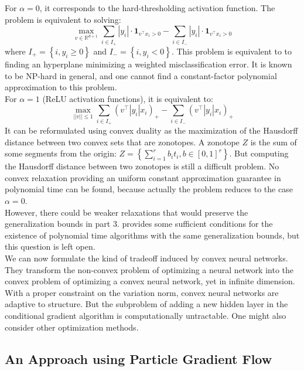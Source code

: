 \documentclass[a4paper, 11pt]{scrartcl}
\begin{document}
For $\alpha = 0$, it corresponds to the hard-thresholding activation function. The problem is equivalent to solving:
\begin{equation}
\max_{v \in \mathbb{R}^{d+1}} \sum_{i\in I_+} |y_i| \cdot \mathbf{1}_{v^\top x_i> 0}  - \sum_{i\in I_-} |y_i| \cdot \mathbf{1}_{v^\top x_i> 0}
\end{equation}
where $I_+ = \left\{i, y_i \geq 0 \right\}$ and $I_- = \left\{i, y_i < 0 \right\}$. This problem is equivalent to to finding an hyperplane minimizing a weighted misclassification error. It is known to be NP-hard in general, and one cannot find a constant-factor polynomial approximation to this problem.\\

For $\alpha = 1$ (ReLU activation functions), it is equivalent to:
\begin{equation}
\max_{||v|| \leq 1} \sum_{i\in I_+} (v^\top |y_i| x_i )_+  - \sum_{i\in I_-} (v^\top |y_i| x_i )_+
\end{equation}
It can be reformulated using convex duality as the maximization of the Hausdorff distance between two convex sets that are zonotopes. A zonotope $Z$ is the sum of some segments from the origin: $Z = \left\{ \sum_{i=1}^r b_i t_i, b \in [0, 1]^r \right\}$. But computing the Hausdorff distance between two zonotopes is still a difficult problem. No convex relaxation providing an uniform constant approximation guarantee in polynomial time can be found, because actually the problem reduces to the case $\alpha = 0$.\\

However, there could be weaker relaxations that would preserve the generalization bounds in part 3. \cite{bach2017breaking} provides some sufficient conditions for the existence of polynomial time algorithms with the same generalization bounds, but this question is left open.\\

We can now formulate the kind of tradeoff induced by convex neural networks. They transform the non-convex problem of optimizing a neural network into the convex problem of optimizing a convex neural network, yet in infinite dimension. With a proper constraint on the variation norm, convex neural networks are adaptive to structure. But the subproblem of adding a new hidden layer in the conditional gradient algorithm is computationally untractable. One might also consider other optimization methods.


\subsection{An Approach using Particle Gradient Flow}
\end{document}
